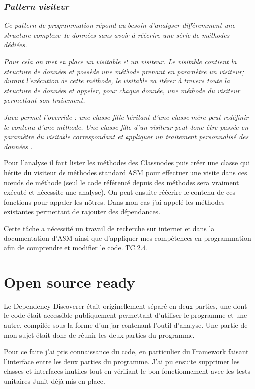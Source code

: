 \documentclass[french,a4paper,12pt]{report}
\begin{document}
\bigskip

\subsubsection{\textit{Pattern visiteur}} 

\textit{Ce pattern de programmation répond au besoin d'analyser différemment une structure complexe de données sans avoir à réécrire une série de méthodes dédiées.}

\textit{Pour cela on met en place un visitable et un visiteur. Le visitable contient la structure de données et possède une méthode prenant en paramètre un visiteur; durant l’exécution de cette méthode, le visitable va itérer à travers toute la structure de données et appeler, pour chaque donnée, une méthode du visiteur permettant son traitement.}

\textit{Java permet l'override : une classe fille héritant d'une classe mère peut redéfinir le contenu d'une méthode. Une classe fille d'un visiteur peut donc être passée en paramètre du visitable correspondant et appliquer un traitement personnalisé des données .}


\bigskip

Pour l'analyse il faut lister les méthodes des Classnodes puis créer une classe qui hérite du visiteur de méthodes standard ASM pour effectuer une visite dans ces nœuds de méthode (seul le code référencé depuis des méthodes sera vraiment exécuté et nécessite une analyse). On peut ensuite réécrire le contenu de ces fonctions pour appeler les nôtres. Dans mon cas j'ai appelé les méthodes existantes permettant de rajouter des dépendances.   

Cette tâche a nécessité un travail de recherche sur internet et dans la documentation d’ASM ainsi que d’appliquer mes compétences en programmation afin de comprendre et modifier le code. \hyperlink{competences}{TC.2.4}.

\section{Open source ready}

Le Dependency Discoverer était originellement séparé en deux parties, une dont le code était accessible publiquement permettant d'utiliser le programme et une autre, compilée sous la forme d'un jar contenant l'outil d'analyse. Une partie de mon sujet était donc de réunir les deux parties du programme.

Pour ce faire j'ai pris connaissance du code, en particulier du Framework faisant l'interface entre les deux parties du programme. J'ai pu ensuite supprimer les classes et interfaces inutiles tout en vérifiant le bon fonctionnement avec les tests unitaires Junit déjà mis en place.
\end{document}
